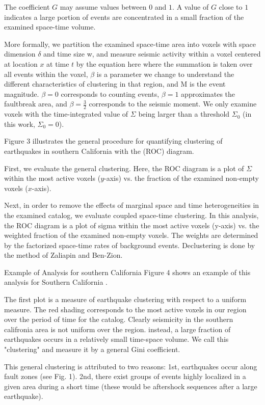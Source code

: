 \documentclass[12pt]{article} %
\theoremstyle{plain}
\begin{document}
The coefficient $G$ may assume values between $0$ and $1$. A value of $G$ close to $1$ indicates a large portion of events are concentrated in a small fraction of the examined space-time volume.

More formally, we partition the examined space-time area into voxels with space dimension $\delta$ and time size w, and measure seismic activity within a voxel centered at location $x$ at time $t$ by the equation here where the summation is taken over all events within the voxel, $\beta$ is a parameter we change to understand the different characteristics of clustering in that region, and M is the event magnitude. $\beta = 0$ corresponds to counting events, $\beta = 1$ approximates the faultbreak area, and $\beta = \frac{3}{2}$ corresponds to the seismic moment. We only examine voxels with the time-integrated value of $\Sigma$ being larger than a threshold $\Sigma_0$ (in this work, $\Sigma_0 = 0$). 

Figure 3 illustrates the general procedure for quantifying clustering of earthquakes in southern California with the (ROC) diagram.

First, we evaluate the general clustering. Here, the ROC diagram is a plot of $\Sigma$ within the most active voxels ($y$-axis) vs. the fraction of the examined non-empty voxels ($x$-axis). 

Next, in order to remove the effects of marginal space and time heterogeneities in the examined catalog, we evaluate coupled space-time clustering. In this analysis, the ROC diagram is a plot of sigma within the most active voxels (y-axis) vs. the weighted fraction of the examined non-empty voxels. The weights are determined by the factorized space-time rates of background events. Declustering is done by the method of Zaliapin and Ben-Zion.

Example of Analysis for southern California
Figure 4 shows an example of this analysis for Southern California . 

The first plot is a measure of earthquake clustering with respect to a uniform measure. The red shading corresponds to the most active voxels in our region over the period of time for the catalog. Clearly seismicity in the southern califronia area is not uniform over the region. instead, a large fraction of earthquakes occurs in a relatively small time-space volume. We call this "clustering" and measure it by a general Gini coefficient.


This general clustering is attributed to two reasons: 1st, earthquakes occur along fault zones (see Fig. 1). 2nd, there exist groups of events highly localized in a given area during a short time (these would be aftershock sequences after a large earthquake).
\end{document}
